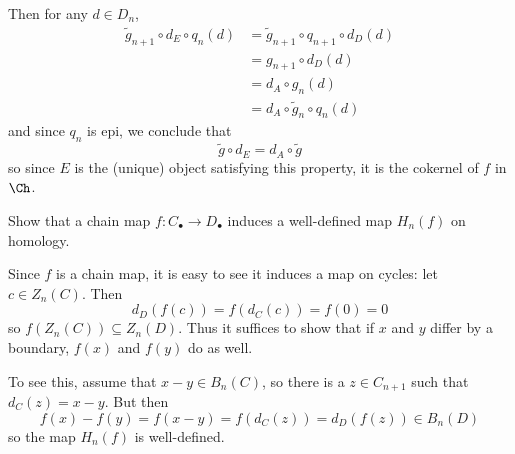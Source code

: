 \documentclass[12pt]{article}
\begin{document}
\begin{sol}
\begin{prf}
	Then for any $d\in D_n$, 
	\begin{align*}
		\tilde g_{n+1}\circ d_E\circ q_n(d) &= \tilde g_{n+1}\circ q_{n+1}\circ d_D(d)\\
		&= g_{n+1}\circ d_D(d)\\
		&= d_A\circ g_n(d)\\
		&= d_A\circ \tilde g_n\circ q_n(d)
	\end{align*}
	and since $q_n$ is epi, we conclude that 
	\[\tilde g\circ d_E=d_A\circ \tilde g\]
	so since $E$ is the (unique) object satisfying this property, it is the cokernel of $f$ in $\Ch$.
	\end{prf}
\end{sol}

\begin{prob}
	Show that a chain map $f:C_\bullet\to D_\bullet$ induces a well-defined map $H_n(f)$ on homology.
\end{prob}
\begin{sol}
	Since $f$ is a chain map, it is easy to see it induces a map on cycles: let $c\in Z_n(C)$.
	Then 
	\[d_D(f(c))=f(d_C(c))=f(0)=0\]
	so $f(Z_n(C))\subseteq Z_n(D).$ Thus it suffices to show that if $x$ and $y$ differ by a boundary,
	$f(x)$ and $f(y)$ do as well.

	To see this, assume that $x-y\in B_n(C)$, so there is a $z\in C_{n+1}$ such that $d_C(z)=x-y$.
	But then 
	\[f(x)-f(y)=f(x-y)=f(d_C(z))=d_D(f(z))\in B_n(D)\]
	so the map $H_n(f)$ is well-defined.
\end{sol}
\end{document}
